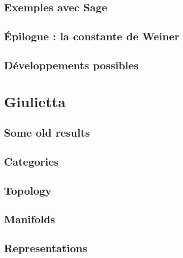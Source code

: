 \documentclass[a4paper,twoside,11pt]{book}
\begin{document}
\chapter{Exemples avec Sage}


\chapter{Épilogue : la constante de Weiner}



\chapter{Développements possibles}




\emptyInputPath
{}

\part{Giulietta}

\chapter{Some old results}


\chapter{Categories}        \label{chap_category}


\chapter{Topology}              \label{chap_topology}



\chapter{Manifolds} \label{Chapitre_FB}



\chapter{Representations}

\end{document}
